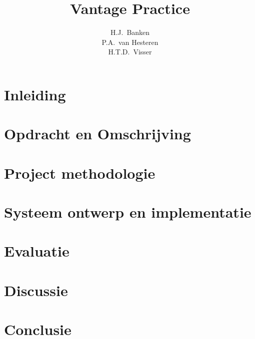 \documentclass[dutch]{style/tudelft-report}
\begin{document}
\frontmatter

\title[Bachelorproject]{Vantage Practice}
\author{H.J.\ Banken \\ P.A.\ van Hesteren \\ H.T.D.\ Visser}
\makecover





\tableofcontents



\mainmatter

\chapter{Inleiding} \label{ch:inleiding} 

\chapter{Opdracht en Omschrijving} \label{ch:opdracht-en-omschrijving} 

\chapter{Project methodologie} \label{ch:project-methodologie} 

\chapter{Systeem ontwerp en implementatie} \label{ch:systeem-ontwerp-en-implementatie} 

\chapter{Evaluatie} \label{ch:evaluatie} 

\chapter{Discussie} \label{ch:discussie} 

\chapter{Conclusie} \label{ch:conclusie} 
\end{document}
